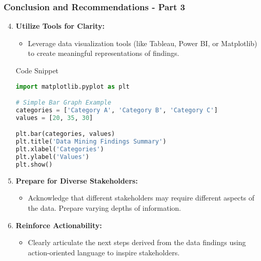 \documentclass{beamer}
\begin{document}
\begin{frame}[fragile]
    \frametitle{Conclusion and Recommendations - Part 3}
    \begin{enumerate}
        \setcounter{enumi}{3} %
        \item \textbf{Utilize Tools for Clarity:}
        \begin{itemize}
            \item Leverage data visualization tools (like Tableau, Power BI, or Matplotlib) to create meaningful representations of findings.
        \end{itemize}

        \begin{block}{Code Snippet}
        \begin{lstlisting}[language=Python]
import matplotlib.pyplot as plt

# Simple Bar Graph Example
categories = ['Category A', 'Category B', 'Category C']
values = [20, 35, 30]

plt.bar(categories, values)
plt.title('Data Mining Findings Summary')
plt.xlabel('Categories')
plt.ylabel('Values')
plt.show()
        \end{lstlisting}
        \end{block}

        \item \textbf{Prepare for Diverse Stakeholders:}
        \begin{itemize}
            \item Acknowledge that different stakeholders may require different aspects of the data. Prepare varying depths of information.
        \end{itemize}

        \item \textbf{Reinforce Actionability:}
        \begin{itemize}
            \item Clearly articulate the next steps derived from the data findings using action-oriented language to inspire stakeholders.
        \end{itemize}
    \end{enumerate}
\end{frame}
\end{document}
